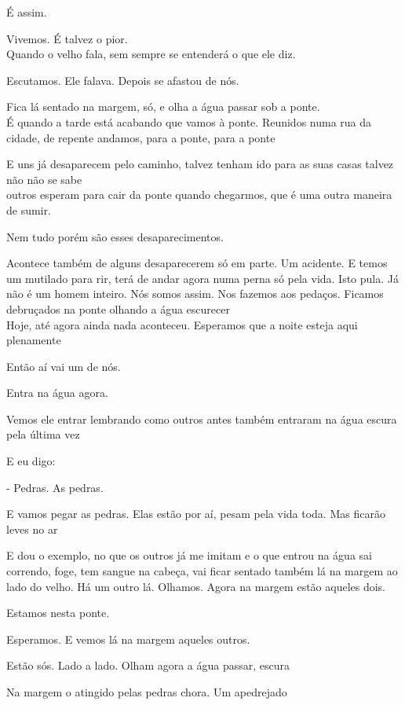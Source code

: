 É assim.

Vivemos. É talvez o pior.\\

Quando o velho fala, sem sempre se entenderá o que ele diz.

Escutamos. Ele falava. Depois se afastou de nós.

Fica lá sentado na margem, só, e olha a água passar sob a ponte.\\

É quando a tarde está acabando que vamos à ponte. Reunidos numa rua da
cidade, de repente andamos, para a ponte, para a ponte

E uns já desaparecem pelo caminho, talvez tenham ido para as suas casas
talvez não não se sabe\\

outros esperam para cair da ponte quando chegarmos, que é uma outra
maneira de sumir.

Nem tudo porém são esses desaparecimentos.

Acontece também de alguns desaparecerem só em parte. Um acidente. E
temos um mutilado para rir, terá de andar agora numa perna só pela vida.
Isto pula. Já não é um homem inteiro. Nós somos assim. Nos fazemos aos
pedaços. Ficamos debruçados na ponte olhando a água escurecer\\

Hoje, até agora ainda nada aconteceu. Esperamos que a noite esteja aqui
plenamente

Então aí vai um de nós.

Entra na água agora.

Vemos ele entrar lembrando como outros antes também entraram na água
escura pela última vez

E eu digo:

- Pedras. As pedras.

E vamos pegar as pedras. Elas estão por aí, pesam pela vida toda. Mas
ficarão leves no ar

E dou o exemplo, no que os outros já me imitam e o que entrou na água
sai correndo, foge, tem sangue na cabeça, vai ficar sentado também lá na
margem ao lado do velho. Há um outro lá. Olhamos. Agora na margem estão
aqueles dois.

Estamos nesta ponte.

Esperamos. E vemos lá na margem aqueles outros.

Estão sós. Lado a lado. Olham agora a água passar, escura

Na margem o atingido pelas pedras chora. Um apedrejado

